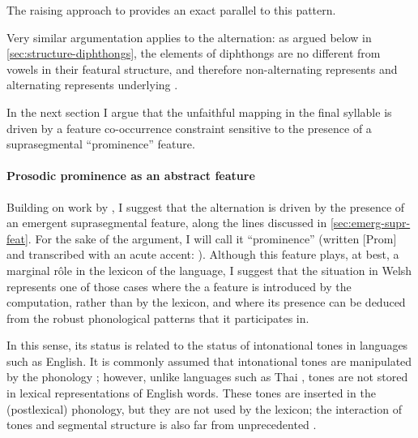 The raising approach to \ipa{[ə]} provides an exact parallel to this pattern.

Very similar argumentation applies to the \alternation{[əu]}{[iu]} alternation: as argued below in \cref{sec:structure-diphthongs}, the elements of diphthongs are no different from vowels in their featural structure, and therefore non\hyp alternating \ipa{[iu]} represents  and alternating \alternation{[əu]}{[iu]} represents underlying .

In the next section I argue that the unfaithful mapping in the final syllable is driven by a feature co\hyp occurrence constraint sensitive to the presence of a suprasegmental \enquote{prominence} feature.

\paragraph{Prosodic prominence as an abstract feature}
\label{sec:pros-prom-as}

Building on work by \citet{bosch96:_promin}, I suggest that the alternation is driven by the presence of an emergent suprasegmental feature, along the lines discussed in \cref{sec:emerg-supr-feat}. For the sake of the argument, I will call it \enquote{prominence} (written [Prom] and transcribed with an acute accent: \ipa{[é]}). Although this feature plays, at best, a marginal rôle in the lexicon of the language, I suggest that the situation in Welsh represents one of those cases where the a feature is introduced by the computation, rather than by the lexicon, and where its presence can be deduced from the robust phonological patterns that it participates in.

In this sense, its status is related to the status of intonational tones in languages such as English. It is commonly assumed that intonational tones are manipulated by the phonology \citep{pierrehumbert80:_englis,gussenhoven04}; however, unlike languages such as Thai \citep[\egm][]{moren06:_thai}, tones are not stored in lexical representations of English words. These tones are inserted in the (postlexical) phonology, but they are not used by the lexicon; the interaction of tones and segmental structure is also far from unprecedented \citep{hyman74:_univer_tone_rules,hombert78:_conson,jiang-kang99:_tone_optim_theor,tang08,beckerng:_inter_atr_sloven}.


